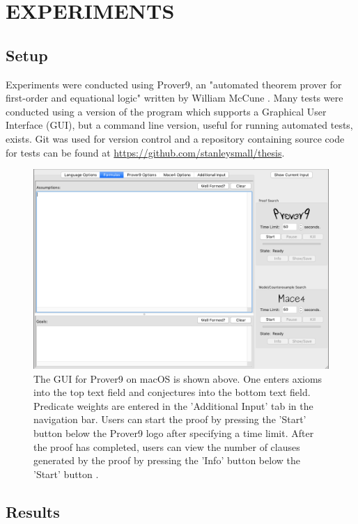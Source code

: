 \documentclass{article}
\begin{document}
\newpage
\vspace*{.05in}
\section{\MakeUppercase{Experiments}}

\subsection{{Setup}}

Experiments were conducted using Prover9, an "automated theorem prover for first-order and equational logic" written by William McCune \cite{mccune2005prover9}. Many tests were conducted using a version of the program which supports a Graphical User Interface (GUI), but a command line version, useful for running automated tests, exists. 
Git was used for version control and a repository containing source code for tests can be found at \url{https://github.com/stanleysmall/thesis}.
\begin{figure}[h]
\centering
\includegraphics[width=6in]{prover9}
\caption{The GUI for Prover9 on macOS is shown above. One enters axioms into the top text field and conjectures into the bottom text field. Predicate weights are entered in the 'Additional Input' tab in the navigation bar. Users can start the proof by pressing the 'Start' button below the Prover9 logo after specifying a time limit. After the proof has completed, users can view the number of clauses generated by the proof by pressing the 'Info' button below the 'Start' button \cite{mccune2005prover9}.}
\label{fig:prover9}
\end{figure}

\subsection{Results}
\end{document}
